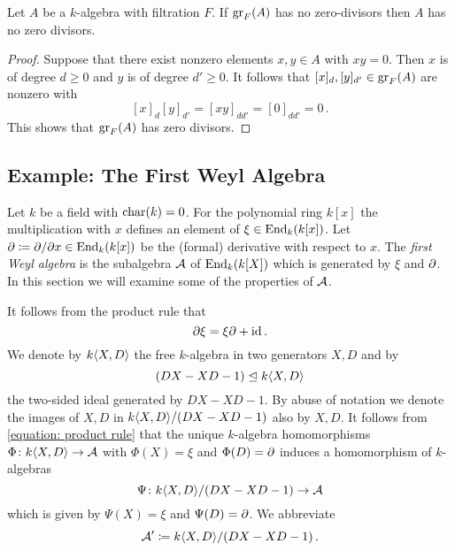 \begin{lemma}
  \label{lemma: associated graded reflects no zero divisors}
  Let $A$ be a $k$-algebra with filtration $F$.
  If $\operatorname{gr}_F(A)$ has no zero-divisors then $A$ has no zero divisors.
\end{lemma}


\begin{proof}
  Suppose that there exist nonzero elements $x, y \in A$ with $xy = 0$.
  Then $x$ is of degree $d \geq 0$ and $y$ is of degree $d' \geq 0$.
  It follows that $[x]_d, [y]_{d'} \in \operatorname{gr}_F(A)$ are nonzero with
  \[
      [x]_d [y]_{d'}
    = [xy]_{d d'}
    = [0]_{d d'}
    = 0 \,.
  \]
  This shows that $\operatorname{gr}_F(A)$ has zero divisors.
\end{proof}





\subsection{Example: The First Weyl Algebra}
\label{subsection: first weyl algebra}


\begin{fluff}
  Let $k$ be a field with $\operatorname{char}(k) = 0$.
  For the polynomial ring $k[x]$ the multiplication with $x$ defines an element of $\xi \in \operatorname{End}_k(k[x])$.
  Let $\partial \coloneqq \partial/\partial x \in \operatorname{End}_k(k[x])$ be the (formal) derivative with respect to $x$.
  The \emph{first Weyl algebra} is the subalgebra $\operatorname{\mathcal{A}}$ of $\operatorname{End}_k(k[X])$ which is generated by $\xi$ and $\partial$.
  In this section we will examine some of the properties of $\operatorname{\mathcal{A}}$.
\end{fluff}


\begin{fluff}
  It follows from the product rule that
  \begin{equation}
  \label{equation: product rule}
      \partial \xi
    = \xi \partial + {\operatorname{id}} \,.
  \end{equation}
  We denote by $k\langle X,D \rangle$ the free $k$-algebra in two generators $X,D$ and by
  \[
              (DX - XD - 1)
    \trianglelefteq k\langle X,D \rangle
  \]
  the two-sided ideal generated by $DX - XD - 1$.
  By abuse of notation we denote the images of $X, D$ in $k\langle X,D \rangle/(DX-XD-1)$ also by $X, D$.
  It follows from \eqref{equation: product rule} that the unique $k$-algebra homomorphisms $\Phi \colon k\langle X,D \rangle \to \operatorname{\mathcal{A}}$ with $\Phi(X) = \xi$ and $\Phi(D) = \partial$ induces a homomorphism of $k$-algebras
  \[
            \Psi
    \colon  k\langle X,D \rangle/(DX - XD - 1)
    \to     \operatorname{\mathcal{A}}
  \]
  which is given by $\Psi(X) = \xi$ and $\Psi(D) = \partial$.
  We abbreviate
  \[
              \operatorname{\mathcal{A}}'
    \coloneqq  k\langle X,D \rangle/(DX - XD - 1) \,.
  \]
\end{fluff}



